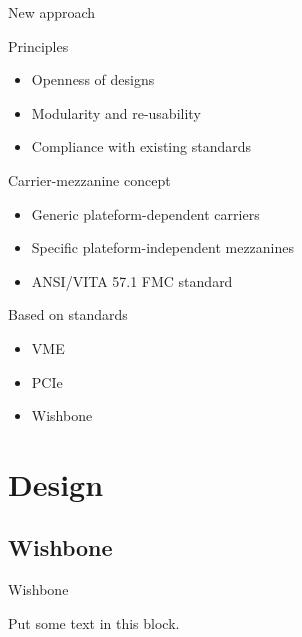 \documentclass[compress,red]{beamer}
\begin{document}
\begin{frame}{New approach}

  \begin{block}{Principles}
    \begin{itemize}
    \item Openness of designs
    \item Modularity and re-usability
    \item Compliance with existing standards
    \end{itemize}
  \end{block}

  \begin{block}{Carrier-mezzanine concept}
    \begin{itemize}
    \item Generic plateform-dependent carriers
    \item Specific plateform-independent mezzanines
    \item ANSI/VITA 57.1 FMC standard
    \end{itemize}
  \end{block}

  \begin{block}{Based on standards}
    \begin{itemize}
    \item VME
    \item PCIe
    \item Wishbone
    \end{itemize}
  \end{block}

\end{frame}


\section{Design}

\subsection{Wishbone}

\begin{frame}{Wishbone}

  \begin{block}{}
    Put some text in this block.
  \end{block}

\end{frame}
\end{document}
